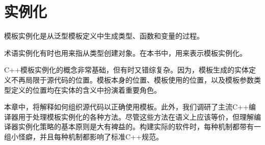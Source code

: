 \chapter{实例化}
模板实例化是从泛型模板定义中生成类型、函数和变量的过程。

\begin{notice}
术语实例化有时也用来指从类型创建对象。在本书中，用来表示模板实例化。
\end{notice}

C++模板实例化的概念非常基础，但有时又错综复杂。因为，模板生成的实体定义不再局限于源代码的位置。模板本身的位置、模板使用的位置，以及模板参数类型定义的位置均在实体的含义中扮演着重要角色。

本章中，将解释如何组织源代码以正确使用模板。此外，我们调研了主流C++编译器用于处理模板实例化的各种方法。尽管这些方法在语义上应该等价，但理解编译器实例化策略的基本原则是大有裨益的。构建实际的软件时，每种机制都带有一组小怪癖，并且每种机制都影响了标准C++规范。







